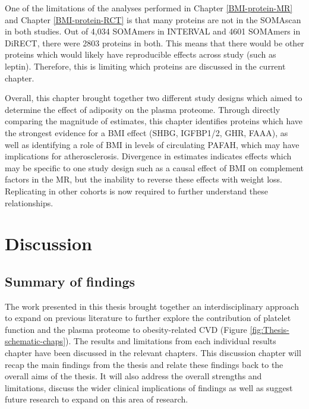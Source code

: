 \documentclass[11pt,twoside]{bristolthesis}
\begin{document}
One of the limitations of the analyses performed in Chapter \ref{BMI-protein-MR} and Chapter \ref{BMI-protein-RCT} is that many proteins are not in the SOMAscan in both studies. Out of 4,034 SOMAmers in INTERVAL and 4601 SOMAmers in DiRECT, there were 2803 proteins in both. This means that there would be other proteins which would likely have reproducible effects across study (such as leptin). Therefore, this is limiting which proteins are discussed in the current chapter.

Overall, this chapter brought together two different study designs which aimed to determine the effect of adiposity on the plasma proteome. Through directly comparing the magnitude of estimates, this chapter identifies proteins which have the strongest evidence for a BMI effect (SHBG, IGFBP1/2, GHR, FAAA), as well as identifying a role of BMI in levels of circulating PAFAH, which may have implications for atherosclerosis. Divergence in estimates indicates effects which may be specific to one study design such as a causal effect of BMI on complement factors in the MR, but the inability to reverse these effects with weight loss. Replicating in other cohorts is now required to further understand these relationships.

\hypertarget{Discussion}{%
\chapter{Discussion}\label{Discussion}}

\hypertarget{summary-of-findings}{%
\section{Summary of findings}\label{summary-of-findings}}

The work presented in this thesis brought together an interdisciplinary approach to expand on previous literature to further explore the contribution of platelet function and the plasma proteome to obesity-related CVD (Figure \ref{fig:Thesis-schematic-chaps}). The results and limitations from each individual results chapter have been discussed in the relevant chapters. This discussion chapter will recap the main findings from the thesis and relate these findings back to the overall aims of the thesis. It will also address the overall strengths and limitations, discuss the wider clinical implications of findings as well as suggest future research to expand on this area of research.
\end{document}
